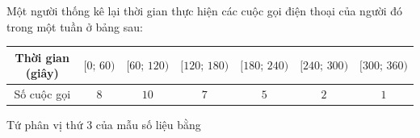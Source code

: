 \begin{ex}%
	Một người thống kê lại thời gian thực hiện  các cuộc gọi điện thoại của người đó trong một tuần ở bảng sau:
	\begin{center}
		\begin{tabular}{|c|c|c|c|c|c|c|}
			\hline 
			Thời gian (giây)& $ [0;\,60) $ & $ [60;\,120) $ & $ [120;\,180) $ & $ [180;\,240)  $ & $ [240;\,300) $ & $ [300;\,360) $ \\
			 \hline
			Số cuộc gọi & $ 8 $ & $ 10 $ & $ 7  $ & $ 5 $ & $ 2 $ & $ 1 $ \\
			 \hline
		\end{tabular}
	\end{center}
	 Tứ phân vị thứ 3 của mẫu số liệu bằng
\end{ex}

